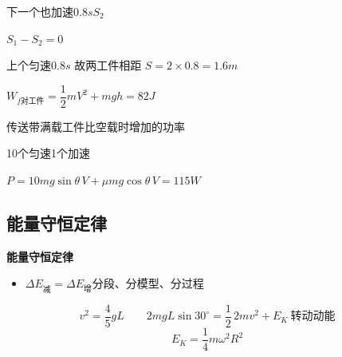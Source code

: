 下一个也加速$0.8\unit{s}$\quad $S_2$

$S_1-S_2=0$

上个匀速$0.8\unit{s}$ 故两工件相距 $S=2\times0.8=1.6\unit{m}$

$W_{f\text{对工件}}=\dfrac12 mV^2+mgh=82\unit{J}$

传送带满载工件比空载时增加的功率

10个匀速\quad 1个加速

$P=10mg\sin\theta\,V+\mu mg\cos\theta\,V=115\unit{W}$

\subsection{能量守恒定律}
\textbf{能量守恒定律}
\begin{itemize}
\item $\Delta E_{\text{减}}=\Delta E_{\text{增}}$\quad 分段、分模型、分过程
\end{itemize}


\[
v^2=\frac45 gL\qquad 2mgL\sin30^\circ=\frac12\,2mv^2+E_K\ \text{转动动能}
\]
\[
E_K=\frac14 m\omega^2R^2
\]

